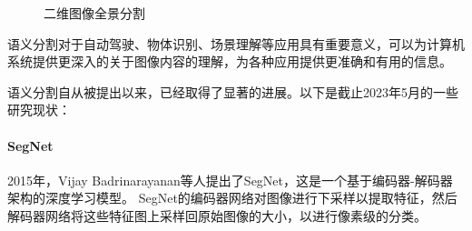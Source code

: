 \begin{figure}[htbp]
	\caption{二维图像全景分割}
	\label{fig:panopticsegmentation}
\end{figure}
语义分割对于自动驾驶、物体识别、场景理解等应用具有重要意义，可以为计算机系统提供更深入的关于图像内容的理解，为各种应用提供更准确和有用的信息。

\par 语义分割自从被提出以来，已经取得了显著的进展\cite{pascal,sift_flow,textonboost}。以下是截止2023年5月的一些研究现状：

\paragraph{SegNet}
\par 2015年，Vijay Badrinarayanan等人提出了SegNet\cite{segnet}，这是一个基于编码器-解码器架构的深度学习模型。
SegNet的编码器网络对图像进行下采样以提取特征，然后解码器网络将这些特征图上采样回原始图像的大小，以进行像素级的分类。


